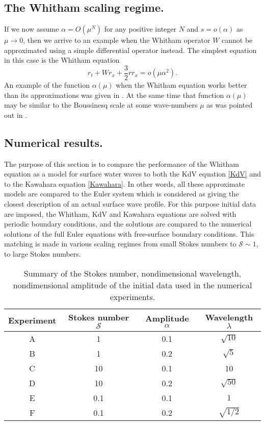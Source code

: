 \subsection{The Whitham scaling regime.}
%
%
If we now assume $\alpha = O(\mu^N)$ for any positive integer $N$
and $s = o(\alpha)$ as $\mu \to 0$, then we arrive to an example
when the Whitham operator $W$ cannot be approximated
using a simple differential operator instead.
The simplest equation in this case is the Whitham equation
%
\[
	r_t + W r_x + \frac 32 r r_x = o(\mu \alpha^2)
	.
\]
%
An example of the function $\alpha(\mu)$ when the Whitham equation
works better than its approximations was given in \cite{Moldabayev2015}.
At the same time that function $\alpha(\mu)$ may be similar
to the Boussinesq scale at some wave-numbers $\mu$
as was pointed out in \cite{Moldabayev2015}.
%
%
\subsection{Numerical results.}
%
%
%
The purpose of this section is to compare the performance of the Whitham
equation as a model for surface water waves to both the KdV equation \eqref{KdV}
and to the Kawahara equation \eqref{Kawahara}.
In other words, all these approximate models are compared to
the Euler system which is considered as giving the closest description
of an actual surface wave profile.
For this purpose initial data are imposed, the Whitham,
KdV and Kawahara equations are solved with periodic boundary conditions,
and the solutions are compared to the numerical solutions of the full Euler equations
with free-surface boundary conditions.
This matching is made in various scaling regimes
from small Stokes numbers to $\mathcal S \sim 1$, to large Stokes numbers.

\begin{table}
\begin{center}
	\begin{tabular}{| c | c | c | c |}
		\hline
		Experiment  &  Stokes number $\mathcal S$
		&
		Amplitude $\alpha$  &  Wavelength $\lambda$
		\\
		\hline
		A	&  1   &  	 0.1 &	$\sqrt{10}$
		\\	
		B	&  1   & 	 0.2 &	$\sqrt{5}$ 			
		\\
		C	&  10  & 	 0.1 &	10	
		\\
		D	&  10  & 	 0.2 &	$\sqrt{50}$	
		\\	
		E	&  0.1 & 	 0.1 &	$1$ 	
		\\
		F	&  0.1 & 	 0.2 &	$\sqrt{ 1/2 }$			
		\\
		\hline
	\end{tabular}
\end{center}
\caption{Summary of the Stokes number, nondimensional wavelength,
nondimensional amplitude of the initial data used in the numerical experiments.}
\end{table}

